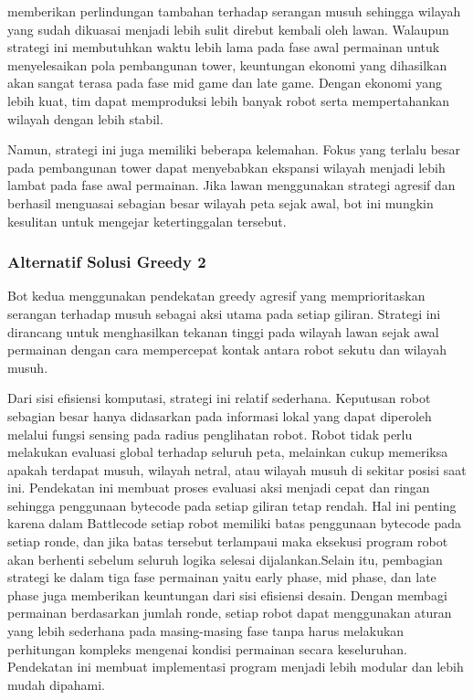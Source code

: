 \documentclass{article}
\begin{document}
memberikan perlindungan tambahan terhadap serangan musuh sehingga wilayah yang sudah dikuasai 
menjadi lebih sulit direbut kembali oleh lawan. Walaupun strategi ini membutuhkan waktu lebih lama 
pada fase awal permainan untuk menyelesaikan pola pembangunan tower, keuntungan ekonomi yang 
dihasilkan akan sangat terasa pada fase mid game dan late game. Dengan ekonomi yang lebih kuat, tim 
dapat memproduksi lebih banyak robot serta mempertahankan wilayah dengan lebih stabil.

Namun, strategi ini juga memiliki beberapa kelemahan. Fokus yang terlalu besar pada pembangunan 
tower dapat menyebabkan ekspansi wilayah menjadi lebih lambat pada fase awal permainan. Jika lawan 
menggunakan strategi agresif dan berhasil menguasai sebagian besar wilayah peta sejak awal, bot ini 
mungkin kesulitan untuk mengejar ketertinggalan tersebut.


\subsubsection{Alternatif Solusi Greedy 2}

Bot kedua menggunakan pendekatan greedy agresif yang memprioritaskan serangan terhadap musuh 
sebagai aksi utama pada setiap giliran. Strategi ini dirancang untuk menghasilkan tekanan tinggi pada 
wilayah lawan sejak awal permainan dengan cara mempercepat kontak antara robot sekutu dan wilayah 
musuh.

Dari sisi efisiensi komputasi, strategi ini relatif sederhana. Keputusan robot sebagian besar hanya 
didasarkan pada informasi lokal yang dapat diperoleh melalui fungsi sensing pada radius penglihatan 
robot. Robot tidak perlu melakukan evaluasi global terhadap seluruh peta, melainkan cukup memeriksa 
apakah terdapat musuh, wilayah netral, atau wilayah musuh di sekitar posisi saat ini. Pendekatan ini 
membuat proses evaluasi aksi menjadi cepat dan ringan sehingga penggunaan bytecode pada setiap 
giliran tetap rendah. Hal ini penting karena dalam Battlecode setiap robot memiliki batas penggunaan 
bytecode pada setiap ronde, dan jika batas tersebut terlampaui maka eksekusi program robot akan 
berhenti sebelum seluruh logika selesai dijalankan.Selain itu, pembagian strategi ke dalam tiga fase 
permainan yaitu early phase, mid phase, dan late phase juga memberikan keuntungan dari sisi efisiensi 
desain. Dengan membagi permainan berdasarkan jumlah ronde, setiap robot dapat menggunakan aturan 
yang lebih sederhana pada masing-masing fase tanpa harus melakukan perhitungan kompleks mengenai 
kondisi permainan secara keseluruhan. Pendekatan ini membuat implementasi program menjadi lebih 
modular dan lebih mudah dipahami.
\end{document}
